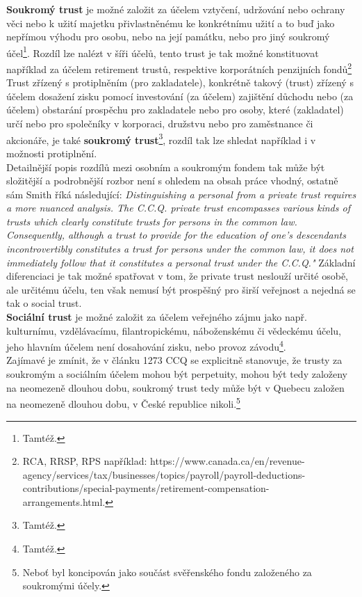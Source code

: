 \documentclass{article}
\begin{document}
\textbf{Soukromý trust} je možné založit za účelem vztyčení, udržování nebo ochrany věci nebo k užití majetku přivlastněnému ke konkrétnímu užití a to buď jako nepřímou výhodu pro osobu, nebo na její památku, nebo pro jiný soukromý účel\footnote{Tamtéž.}. Rozdíl lze nalézt v šíři účelů, tento trust je tak možné konstituovat například za účelem retirement trustů, respektive korporátních penzijních fondů\footnote{RCA, RRSP, RPS například: https://www.canada.ca/en/revenue-agency/services/tax/businesses/topics/payroll/payroll-deductions-contributions/special-payments/retirement-compensation-arrangements.html.}\\

Trust zřízený s protiplněním (pro zakladatele), konkrétně takový (trust) zřízený s účelem dosažení zisku pomocí investování (za účelem) zajištění důchodu nebo (za účelem) obstarání prospěchu pro zakladatele nebo pro osoby, které (zakladatel) určí nebo pro společníky v korporaci, družstvu nebo pro zaměstnance či akcionáře, je také \textbf{soukromý trust}\footnote{Tamtéž.}, rozdíl tak lze shledat například i v možnosti protiplnění.\\

Detailnější popis rozdílů mezi osobním a soukromým fondem tak může být složitější a podrobnější rozbor není s ohledem na obsah práce vhodný, ostatně sám Smith říká následující: \textit{Distinguishing a personal from a private trust requires a more nuanced analysis. The C.C.Q. private trust encompasses various kinds of trusts which clearly constitute trusts for persons in the common law. Consequently, although  a trust to provide for the education of one's descendants incontrovertibly constitutes a trust for persons under the common law, it does not immediately follow that it constitutes a personal trust under the C.C.Q."} Základní diferenciaci je tak možné spatřovat v tom, že private trust neslouží určité osobě, ale určitému účelu, ten však nemusí být prospěšný pro širší veřejnost a nejedná se tak o social trust.\\

\textbf{Sociální trust} je možné založit za účelem veřejného zájmu jako např. kulturnímu, vzdělávacímu, filantropickému, náboženskému či vědeckému účelu, jeho hlavním účelem není dosahování zisku, nebo provoz závodu\footnote{Tamtéž.}.\\

Zajímavé je zmínit, že v článku 1273 CCQ se explicitně stanovuje, že trusty za soukromým a sociálním účelem mohou být perpetuity, mohou být tedy založeny na neomezeně dlouhou dobu, soukromý trust tedy může být v Quebecu založen na neomezeně dlouhou dobu, v České republice nikoli.\footnote{Neboť byl koncipován jako součást svěřenského fondu založeného za soukromými účely.}\\
\end{document}
